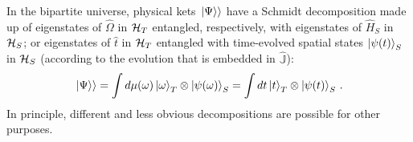 In the bipartite universe, physical kets $\left.\left| \Psi \right\rangle\right\rangle$ have a Schmidt decomposition
made up of
eigenstates of $\hat{\Omega}$ in $\mathcal{H}_T$
entangled, respectively, with
eigenstates of $\hat{H}_S$ in $\mathcal{H}_S$;
or eigenstates of $\hat{t}$ in $\mathcal{H}_T$
entangled with time-evolved spatial states $\ket{\psi(t)}_S$ in $\mathcal{H}_S$
(according to the evolution that is embedded in $\hat{\mathbb{J}}$):
\begin{equation}
  \left.\left| \Psi \right\rangle\right\rangle = \int d\mu(\omega) \ket{\omega}_{T}\otimes\ket{\psi(\omega)}_{S} = \int dt \ket{t}_{T} \otimes \ket{\psi(t)}_{S}\,\text{.} 
\end{equation}
In principle, different and less obvious decompositions are possible for other purposes.
